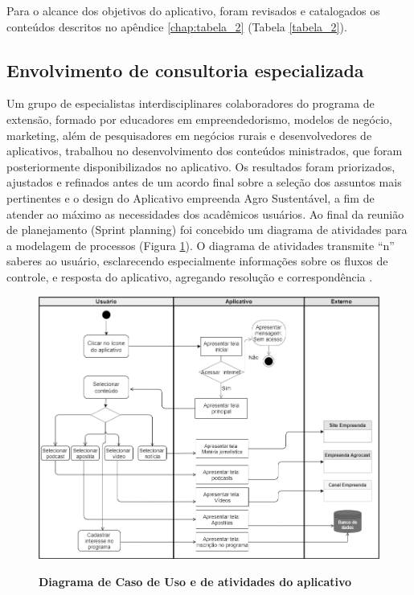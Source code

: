 Para o alcance dos objetivos do aplicativo, foram revisados e catalogados os conteúdos descritos no apêndice \ref{chap:tabela_2} (Tabela \ref{tabela_2}). 



\subsection{Envolvimento de consultoria especializada}

Um grupo de especialistas interdisciplinares colaboradores do programa de extensão, formado por educadores em empreendedorismo, modelos de negócio, marketing, além de pesquisadores em negócios rurais e desenvolvedores de aplicativos, trabalhou no desenvolvimento dos conteúdos ministrados, que foram posteriormente disponibilizados no aplicativo. Os resultados foram priorizados, ajustados e refinados antes de um acordo final sobre a seleção dos assuntos mais pertinentes e o design do Aplicativo empreenda Agro Sustentável, a fim de atender ao máximo as necessidades dos acadêmicos usuários.
Ao final da reunião de planejamento (Sprint planning) foi concebido um diagrama de atividades para a modelagem de processos (Figura \ref{figura_diagrama}). O diagrama de atividades transmite “n” saberes ao usuário, esclarecendo especialmente informações sobre os fluxos de controle, e resposta do aplicativo, agregando resolução e correspondência \cite{pressman_engenharia_2016}.


\begin{figure}[H]
\centering
\caption{\textbf{Diagrama de Caso de Uso e de atividades do aplicativo}}
\includegraphics[scale=0.5]{Imagens/diagrama_aplicativo.png}
\label{figura_diagrama}
\end{figure}


